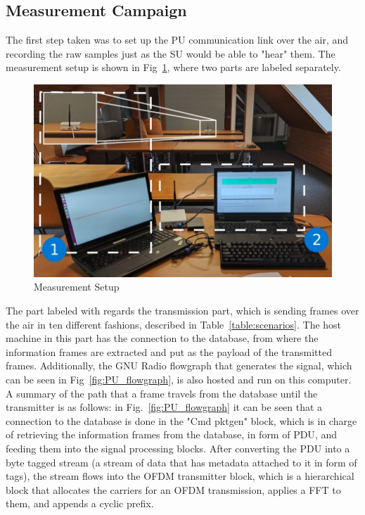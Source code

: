 \subsection{Measurement Campaign}\label{ch:measure}
The first step taken was to set up the \ac{PU} communication link over the air, and recording the raw samples just as the \ac{SU} would be able to "hear" them. The measurement setup is shown in Fig~\ref{fig:measurement}, where two parts are labeled separately.

\begin{figure}[!htb]
    \centering
    \includegraphics[width=0.5\linewidth]{figures/mod}
    \caption{Measurement Setup}
    \label{fig:measurement}
\end{figure}

The part labeled with  regards the transmission part, which is sending frames over the air in ten different fashions, described in Table~\ref{table:scenarios}.  The host machine in this part has the connection to the database, from where the information frames are extracted and put as the payload of the transmitted frames. Additionally, the GNU Radio flowgraph that generates the signal, which can be seen in Fig~\ref{fig:PU_flowgraph}, is also hosted and run on this computer. A summary of the path that a frame travels from the database until the transmitter is as follows: in Fig.~\ref{fig:PU_flowgraph} it can be seen that a connection to the database is done in the "Cmd pktgen" block, which is in charge of retrieving the information frames from the database, in form of \ac{PDU}, and feeding them into the signal processing blocks. After converting the \ac{PDU} into a byte tagged stream (a stream of data that has metadata attached to it in form of tags), the stream flows into the \ac{OFDM} transmitter block, which is a hierarchical block that allocates the carriers for an \ac{OFDM} transmission, applies a \ac{FFT} to them, and appends a cyclic prefix.

